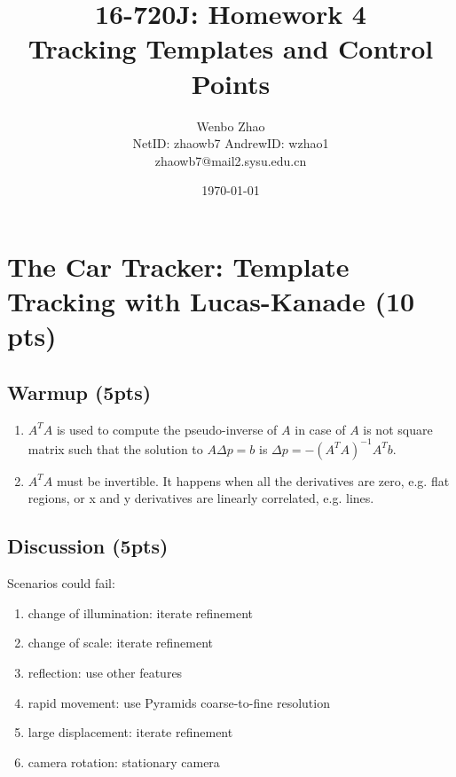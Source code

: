 \documentclass[12pt]{article}
\begin{document}
\title{16-720J: Homework 4\\ Tracking Templates and Control Points}

\author{Wenbo Zhao \\
NetID: zhaowb7 AndrewID: wzhao1 \\
zhaowb7@mail2.sysu.edu.cn}
\date{\today}

\maketitle

\vspace{-1cm}

\section{The Car Tracker: Template Tracking with Lucas-Kanade (10 pts)}
\label{cartracker}

\subsection{Warmup (5pts)}
\label{warmup}
\begin{enumerate}[(1)]
\item $A^TA$ is used to compute the pseudo-inverse of $A$ in case of $A$ is not square matrix such that the solution to $A\Delta p=b$ is $\Delta p=-(A^TA)^{-1}A^Tb$.
\item $A^TA$ must be invertible.
It happens when all the derivatives are zero, e.g. flat regions, or x and y derivatives are linearly correlated, e.g. lines.
\end{enumerate}


\subsection{Discussion (5pts)}
\label{discussion}
Scenarios could fail: 
\begin{enumerate}[(1)]
\item change of illumination: iterate refinement
\item change of scale: iterate refinement 
\item reflection: use other features 
\item rapid movement: use Pyramids coarse-to-fine resolution 
\item large displacement: iterate refinement
\item camera rotation: stationary camera
\end{enumerate}
\end{document}
